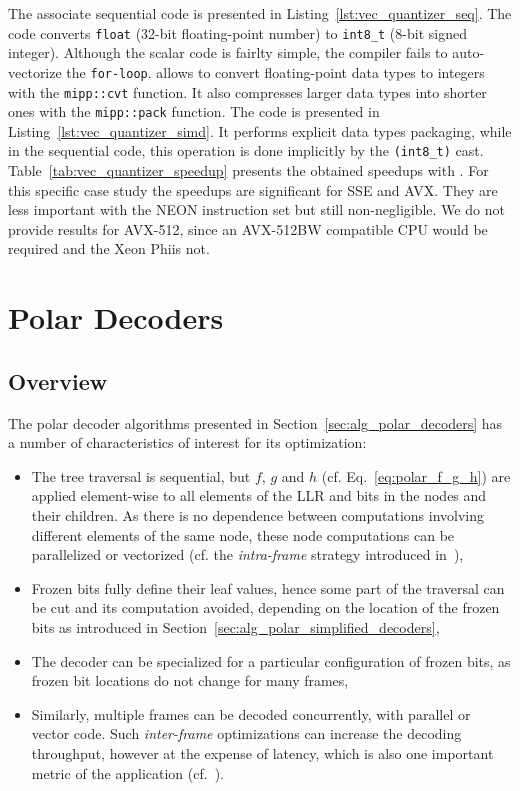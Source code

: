 The associate sequential code is presented in
Listing~\ref{lst:vec_quantizer_seq}. The code converts \verb|float| (32-bit
floating-point number) to \verb|int8_t| (8-bit signed integer). Although the
scalar code is fairlty simple, the compiler fails to auto-vectorize the
\verb|for-loop|. \MIPP allows to convert floating-point data types to integers
with the \verb|mipp::cvt| function. It also compresses larger data types into
shorter ones with the \verb|mipp::pack| function. The \MIPP code is presented in
Listing~\ref{lst:vec_quantizer_simd}. It performs explicit data types packaging,
while in the sequential code, this operation is done implicitly by the
\verb|(int8_t)| cast. Table~\ref{tab:vec_quantizer_speedup} presents the
obtained speedups with \MIPP. For this specific case study the speedups are
significant for SSE and AVX. They are less important with the NEON instruction
set but still non-negligible. We do not provide results for AVX-512, since an
AVX-512BW compatible CPU would be required and the Xeon Phi\TM is not.

\section{Polar Decoders}
\label{sec:vec_polar}

\subsection{Overview}

The polar decoder algorithms presented in Section~\ref{sec:alg_polar_decoders}
has a number of characteristics of interest for its optimization:
\begin{itemize}
  \item The tree traversal is sequential, but $f$, $g$ and $h$ (cf.
    Eq.~\ref{eq:polar_f_g_h}) are applied element-wise to all elements of the
    LLR and bits in the nodes and their children. As there is no dependence
    between computations involving different elements of the same node, these
    node computations can be parallelized or vectorized (cf. the
    \emph{intra-frame} strategy introduced in~\cite{Giard2014}),
  \item Frozen bits fully define their leaf values, hence some part of the
    traversal can be cut and its computation avoided, depending on the
    location of the frozen bits as introduced in
    Section~\ref{sec:alg_polar_simplified_decoders},
  \item The decoder can be specialized for a particular configuration of frozen
    bits, as frozen bit locations do not change for many frames,
  \item Similarly, multiple frames can be decoded concurrently, with parallel or
    vector code. Such \emph{inter-frame} optimizations can increase the decoding
    throughput, however at the expense of latency, which is also one important
    metric of the application (cf.~\cite{LeGal2015a}).
\end{itemize}

